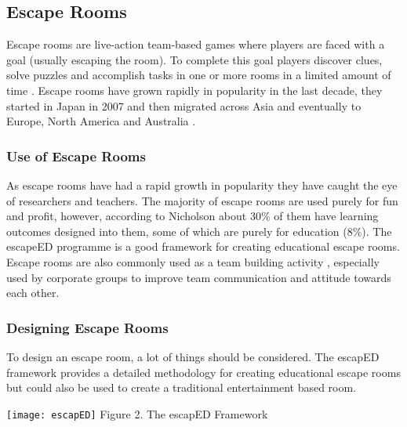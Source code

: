 \documentclass[journal]{IEEEtran}
\begin{document}
\subsection{Escape Rooms} \label{Escape}
Escape rooms are live-action team-based games where players are faced with a goal (usually escaping the room). To complete this goal players discover clues, solve puzzles and accomplish tasks in one or more rooms in a limited amount of time \cite{nicholson_state_nodate,warmelink_amelio:_2017}. 
Escape rooms have grown rapidly in popularity in the last decade, they started in Japan in 2007 and then migrated across Asia and eventually to Europe, North America and Australia \cite{pan_collaboration_2017,nicholson_state_nodate}. 
\subsubsection{Use of Escape Rooms}
As escape rooms have had a rapid growth in popularity they have caught the eye of researchers and teachers. The majority of escape rooms are used purely for fun and profit, however, according to Nicholson \cite{nicholson_state_nodate} about 30\% of them have learning outcomes designed into them, some of which are purely for education (8\%). The escapeED programme \cite{clarke_escaped:_2017} is a good framework for creating educational escape rooms. Escape rooms are also commonly used as a team building activity \cite{warmelink_amelio:_2017}, especially used by corporate groups to improve team communication and attitude towards each other.
\subsubsection{Designing Escape Rooms}
To design an escape room, a lot of things should be considered. The escapED framework \cite{clarke_escaped:_2017} provides a detailed methodology for creating educational escape rooms but could also be used to create a traditional entertainment based room.
\newline

\texttt{[image: escapED]}
Figure 2. The escapED Framework  \cite{clarke_escaped:_2017}
\newline
\end{document}
